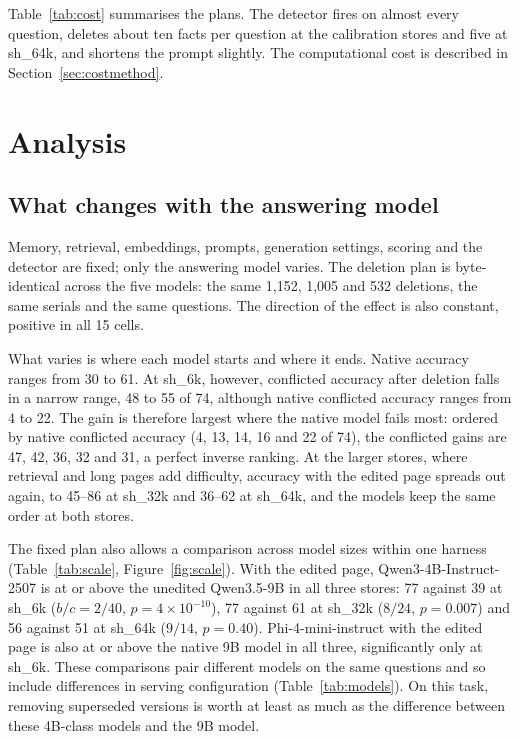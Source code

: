 \documentclass[11pt]{article}
\newcommand{\sub}[1]{\textsf{sh\_#1}}                    %
\begin{document}
Table~\ref{tab:cost} summarises the plans. The detector fires on almost every question, deletes about ten facts per question at the calibration stores and five at \sub{64k}, and shortens the prompt slightly. The computational cost is described in Section~\ref{sec:costmethod}.

\section{Analysis}
\label{sec:analysis}

\subsection{What changes with the answering model}
\label{sec:substitution}

Memory, retrieval, embeddings, prompts, generation settings, scoring and the detector are fixed; only the answering model varies. The deletion plan is byte-identical across the five models: the same 1,152, 1,005 and 532 deletions, the same serials and the same questions. The direction of the effect is also constant, positive in all 15 cells.

What varies is where each model starts and where it ends. Native accuracy ranges from 30 to 61. At \sub{6k}, however, conflicted accuracy after deletion falls in a narrow range, 48 to 55 of 74, although native conflicted accuracy ranges from 4 to 22. The gain is therefore largest where the native model fails most: ordered by native conflicted accuracy (4, 13, 14, 16 and 22 of 74), the conflicted gains are 47, 42, 36, 32 and 31, a perfect inverse ranking. At the larger stores, where retrieval and long pages add difficulty, accuracy with the edited page spreads out again, to 45--86 at \sub{32k} and 36--62 at \sub{64k}, and the models keep the same order at both stores.

The fixed plan also allows a comparison across model sizes within one harness (Table~\ref{tab:scale}, Figure~\ref{fig:scale}). With the edited page, Qwen3-4B-Instruct-2507 is at or above the unedited Qwen3.5-9B in all three stores: 77 against 39 at \sub{6k} ($b/c=2/40$, $p=4\times10^{-10}$), 77 against 61 at \sub{32k} ($8/24$, $p=0.007$) and 56 against 51 at \sub{64k} ($9/14$, $p=0.40$). Phi-4-mini-instruct with the edited page is also at or above the native 9B model in all three, significantly only at \sub{6k}. These comparisons pair different models on the same questions and so include differences in serving configuration (Table~\ref{tab:models}). On this task, removing superseded versions is worth at least as much as the difference between these 4B-class models and the 9B model.
\end{document}
